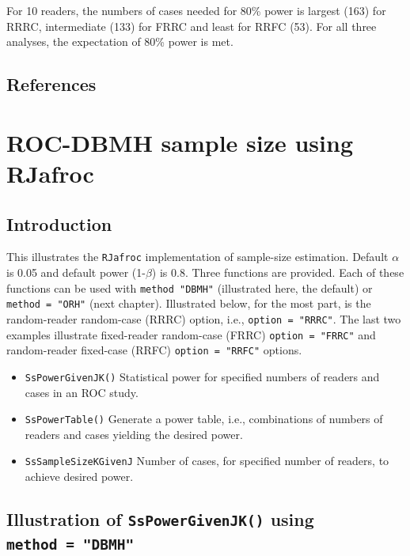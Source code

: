 \documentclass[
]{book}
\providecommand{\tightlist}{%
  \setlength{\itemsep}{0pt}\setlength{\parskip}{0pt}}
\begin{document}
For 10 readers, the numbers of cases needed for 80\% power is largest (163) for RRRC, intermediate (133) for FRRC and least for RRFC (53). For all three analyses, the expectation of 80\% power is met.

\hypertarget{references-6}{%
\section{References}\label{references-6}}

\hypertarget{SSRocDBMHRJafroc}{%
\chapter{ROC-DBMH sample size using RJafroc}\label{SSRocDBMHRJafroc}}

\hypertarget{introduction-9}{%
\section{Introduction}\label{introduction-9}}

This illustrates the \texttt{RJafroc} implementation of sample-size estimation. Default \(\alpha\) is 0.05 and default power (1-\(\beta\)) is 0.8. Three functions are provided. Each of these functions can be used with \texttt{method\ "DBMH"} (illustrated here, the default) or \texttt{method\ =\ "ORH"} (next chapter). Illustrated below, for the most part, is the random-reader random-case (RRRC) option, i.e., \texttt{option\ =\ "RRRC"}. The last two examples illustrate fixed-reader random-case (FRRC) \texttt{option\ =\ "FRRC"} and random-reader fixed-case (RRFC) \texttt{option\ =\ "RRFC"} options.

\begin{itemize}
\tightlist
\item
  \texttt{SsPowerGivenJK()}
  Statistical power for specified numbers of readers and cases in an ROC study.
\item
  \texttt{SsPowerTable()}
  Generate a power table, i.e., combinations of numbers of readers and cases yielding the desired power.
\item
  \texttt{SsSampleSizeKGivenJ}
  Number of cases, for specified number of readers, to achieve desired power.
\end{itemize}

\hypertarget{illustration-of-sspowergivenjk-using-method-dbmh}{%
\section{\texorpdfstring{Illustration of \texttt{SsPowerGivenJK()} using \texttt{method\ =\ "DBMH"}}{Illustration of SsPowerGivenJK() using method = "DBMH"}}\label{illustration-of-sspowergivenjk-using-method-dbmh}}
\end{document}

